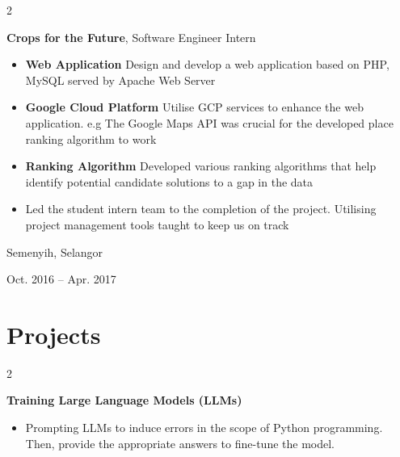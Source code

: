 \documentclass[10pt, letterpaper]{article}
\newenvironment{highlights}{
    \begin{itemize}[
        topsep=0.10 cm,
        parsep=0.10 cm,
        partopsep=0pt,
        itemsep=0pt,
        leftmargin=0.4 cm + 10pt
    ]
}{
    \end{itemize}
} %
\newenvironment{twocolentry}[2][]{
    \onecolentry
    \def\secondColumn{#2}
    \setcolumnwidth{\fill, 4.5 cm}
    \begin{paracol}{2}
}{
    \switchcolumn \raggedleft \secondColumn
    \end{paracol}
    \endonecolentry
} %
\let\hrefWithoutArrow\href
\renewcommand{\href}[2]{\hrefWithoutArrow{#1}{\ifthenelse{\equal{#2}{}}{ }{#2 }\raisebox{.15ex}{\footnotesize \faExternalLink*}}}
\begin{document}
        \begin{twocolentry}{
            Semenyih, Selangor

        Oct. 2016 – Apr. 2017
        }
            \textbf{Crops for the Future}, Software Engineer Intern
            \begin{highlights}
                \item \textbf{Web Application} Design and develop a web application based on PHP, MySQL served by Apache Web Server
                \item \textbf{Google Cloud Platform} Utilise GCP services to enhance the web application. 
                    e.g The Google Maps API was crucial for the developed place ranking algorithm to work
                \item \textbf{Ranking Algorithm} Developed various ranking algorithms that help identify potential candidate solutions to a gap in the data
                \item Led the student intern team to the completion of the project. Utilising project management tools taught to keep us on track
            \end{highlights}
        \end{twocolentry}



    



        





    
    \section{Projects}
        \begin{twocolentry}{
            
        }
            \textbf{Training Large Language Models (LLMs)}
            \begin{highlights}
                \item Prompting LLMs to induce errors in the scope of Python programming. Then, provide the appropriate answers to fine-tune the model.
            \end{highlights}
        \end{twocolentry}
        
\end{document}
